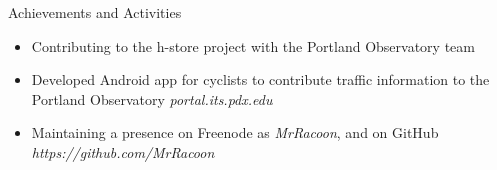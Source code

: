 \documentclass[11pt,oneside]{article}
\newenvironment{ressection}[1]{
    \vspace{4pt}
    {\fontfamily{phv}\selectfont\Large#1}
    \begin{itemize}
    \vspace{3pt}
}{
    \end{itemize}
}
\newcommand{\resitem}[1]{
    \vspace{-4pt}
    \item \begin{flushleft} #1 \end{flushleft}
}
\begin{document}
\begin{ressection}{Achievements and Activities}
    \resitem{Contributing to the h-store project with the Portland Observatory team}
    \resitem{Developed Android app for cyclists to contribute traffic information to the Portland Observatory \textit{portal.its.pdx.edu}}
    \resitem{Maintaining a presence on Freenode as \textit{MrRacoon}, and on GitHub \textit{https://github.com/MrRacoon}}
\end{ressection}
\end{document}
